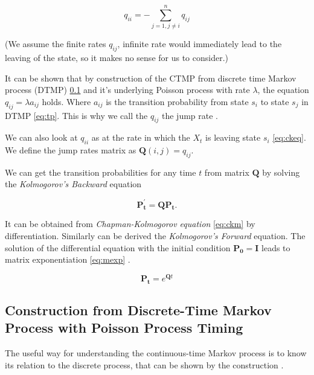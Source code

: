 \documentclass[thesis=M,english]{FITthesis}[2012/10/20]
\newcommand{\matr}[1]{\mathbf{#1}}
\begin{document}
\begin{equation}\label{eq:qii}
 q_{ii} =  - \sum_{j = 1,j \neq i}^{ n} q_{ij} 
\end{equation}

(We assume the finite rates $q_{ij}$, infinite rate would immediately lead to the leaving of the state, so it makes no sense for us to consider.)

It can be shown that by construction of the CTMP from discrete time Markov process (DTMP) \ref{sec:constr}  and  it's underlying Poisson process with rate $\lambda$, the equation $q_{ij} = \lambda a_{ij}$ holds. Where $a_{ij}$ is the transition probability from state $s_i$ to state $s_j$ in DTMP \ref{eq:tp}. This is why we call the $q_{ij}$ the jump rate \cite{Gr01}.  

We can also look at $q_{ii}$ as at the rate in which the $X_t$ is leaving state $s_i$ \eqref{eq:ckeq}. We define the jump rates matrix as $\matr{Q}(i,j) = q_{ij}$.

We can get the transition probabilities for any time $t$ from matrix $\matr{Q}$ by solving the \textit{Kolmogorov's Backward} equation 

\begin{equation}\label{eq:kbe}
\matr{P_t^{'}} = \matr{Q} \matr{P_{t}}.
\end{equation}

It can be obtained from \textit{Chapman-Kolmogorov equation} \eqref{eq:ckm} by differentiation. Similarly can be derived the \textit{Kolmogorov's Forward} equation. The solution of the differential equation with the initial condition $\matr{P_0} = \matr{I}$ leads to matrix exponentiation \eqref{eq:mexp} \cite{Gr01}. 


\begin{equation}\label{eq:mexp}
\matr{P_{t}} = e^{\matr{Q}t}  
\end{equation}


\subsection{Construction from Discrete-Time Markov Process with Poisson Process Timing }\label{sec:constr} 

The useful way for understanding the continuous-time Markov process is to know its relation to the discrete process, that can be shown by the construction \cite{Gr01}.
\end{document}
